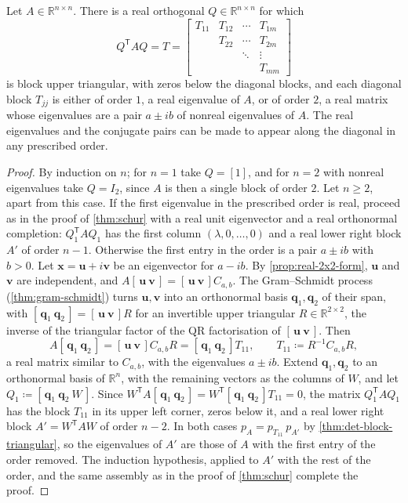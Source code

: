 \begin{theorem}
\label{thm:real-schur}
Let $A\in\mathbb R^{n\times n}$. There is a real orthogonal $Q\in\mathbb R^{n\times n}$ for which
\[
Q^{\mathsf T}AQ=T=\begin{bmatrix}T_{11}&T_{12}&\cdots&T_{1m}\\&T_{22}&\cdots&T_{2m}\\&&\ddots&\vdots\\&&&T_{mm}\end{bmatrix}
\]
is block upper triangular, with zeros below the diagonal blocks, and each diagonal block $T_{jj}$ is either of order $1$, a real eigenvalue of $A$, or of order $2$, a real matrix whose eigenvalues are a pair $a\pm ib$ of nonreal eigenvalues of $A$. The real eigenvalues and the conjugate pairs can be made to appear along the diagonal in any prescribed order.
\end{theorem}

\begin{proof}
By induction on $n$; for $n=1$ take $Q=[1]$, and for $n=2$ with nonreal eigenvalues take $Q=I_2$, since $A$ is then a single block of order $2$. Let $n\ge2$, apart from this case. If the first eigenvalue in the prescribed order is real, proceed as in the proof of \cref{thm:schur} with a real unit eigenvector and a real orthonormal completion: $Q_1^{\mathsf T}AQ_1$ has the first column $(\lambda,0,\ldots,0)$ and a real lower right block $A'$ of order $n-1$. Otherwise the first entry in the order is a pair $a\pm ib$ with $b>0$. Let $\mathbf x=\mathbf u+i\mathbf v$ be an eigenvector for $a-ib$. By \cref{prop:real-2x2-form}, $\mathbf u$ and $\mathbf v$ are independent, and $A[\,\mathbf u\ \mathbf v\,]=[\,\mathbf u\ \mathbf v\,]C_{a,b}$. The Gram--Schmidt process (\cref{thm:gram-schmidt}) turns $\mathbf u,\mathbf v$ into an orthonormal basis $\mathbf q_1,\mathbf q_2$ of their span, with $[\,\mathbf q_1\ \mathbf q_2\,]=[\,\mathbf u\ \mathbf v\,]R$ for an invertible upper triangular $R\in\mathbb R^{2\times2}$, the inverse of the triangular factor of the QR factorisation of $[\,\mathbf u\ \mathbf v\,]$. Then
\[
A[\,\mathbf q_1\ \mathbf q_2\,]=[\,\mathbf u\ \mathbf v\,]C_{a,b}R=[\,\mathbf q_1\ \mathbf q_2\,]T_{11},\qquad T_{11}\coloneqq R^{-1}C_{a,b}R ,
\]
a real matrix similar to $C_{a,b}$, with the eigenvalues $a\pm ib$. Extend $\mathbf q_1,\mathbf q_2$ to an orthonormal basis of $\mathbb R^n$, with the remaining vectors as the columns of $W$, and let $Q_1\coloneqq[\,\mathbf q_1\ \mathbf q_2\ W\,]$. Since $W^{\mathsf T}A[\,\mathbf q_1\ \mathbf q_2\,]=W^{\mathsf T}[\,\mathbf q_1\ \mathbf q_2\,]T_{11}=0$, the matrix $Q_1^{\mathsf T}AQ_1$ has the block $T_{11}$ in its upper left corner, zeros below it, and a real lower right block $A'=W^{\mathsf T}AW$ of order $n-2$. In both cases $p_A=p_{T_{11}}\,p_{A'}$ by \cref{thm:det-block-triangular}, so the eigenvalues of $A'$ are those of $A$ with the first entry of the order removed. The induction hypothesis, applied to $A'$ with the rest of the order, and the same assembly as in the proof of \cref{thm:schur} complete the proof.
\end{proof}


